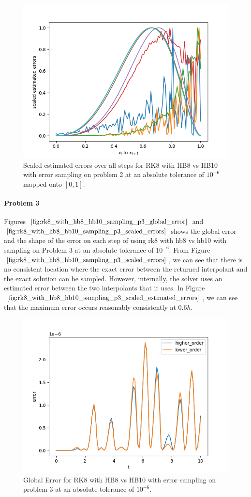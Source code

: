 \begin{figure}[H]
\centering
\includegraphics[width=0.7\linewidth]{./figures/rk8_with_hb8_hb10_sampling_p2_scaled_estimated_errors}
\caption{Scaled estimated errors over all steps for RK8 with HB8 vs HB10 with error sampling on problem 2 at an absolute tolerance of $10^{-6}$ mapped onto $[0, 1]$.}
\label{fig:rk8_with_hb8_hb10_sampling_p2_scaled_estimated_errors}
\end{figure}

\paragraph{Problem 3} Figures $\ref{fig:rk8_with_hb8_hb10_sampling_p3_global_error}$ and $\ref{fig:rk8_with_hb8_hb10_sampling_p3_scaled_errors}$ shows the global error and the shape of the error on each step of using rk8 with hb8 vs hb10 with sampling on Problem 3 at an absolute tolerance of $10^{-6}$. From Figure $\ref{fig:rk8_with_hb8_hb10_sampling_p3_scaled_errors}$, we can see that there is no consistent location where the exact error between the returned interpolant and the exact solution can be sampled. However, internally, the solver uses an estimated error between the two interpolants that it uses. In Figure $\ref{fig:rk8_with_hb8_hb10_sampling_p3_scaled_estimated_errors}$, we can see that the maximum error occurs reasonably consistently at $0.6h$.

\begin{figure}[H]
\centering
\includegraphics[width=0.7\linewidth]{./figures/rk8_with_hb8_hb10_sampling_p3_global_error}
\caption{Global Error for RK8 with HB8 vs HB10 with error sampling on problem 3 at an absolute tolerance of $10^{-6}$.}
\label{fig:rk8_with_hb8_hb10_sampling_p3_global_error}
\end{figure}

